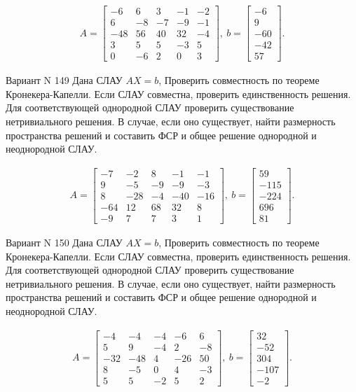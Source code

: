 \documentclass[11pt]{report}
\begin{document}
\begin{align*}
 A = \left[\begin{matrix}-6 & 6 & 3 & -1 & -2\\6 & -8 & -7 & -9 & -1\\-48 & 56 & 40 & 32 & -4\\3 & 5 & 5 & -3 & 5\\0 & -6 & 2 & 0 & 3\end{matrix}\right],
\ b = \left[\begin{matrix}-6\\9\\-60\\-42\\57\end{matrix}\right]. 
 \end{align*}

Вариант N 149
Дана СЛАУ $AX = b$,
Проверить совместность по теореме Кронекера-Капелли. Если СЛАУ совместна, проверить единственность решения.
Для соответствующей однородной СЛАУ проверить существование нетривиального решения. В случае, если оно существует,
найти размерность пространства решений и составить ФСР и общее решение однородной  и неоднородной СЛАУ.


\begin{align*}
 A = \left[\begin{matrix}-7 & -2 & 8 & -1 & -1\\9 & -5 & -9 & -9 & -3\\8 & -28 & -4 & -40 & -16\\-64 & 12 & 68 & 32 & 8\\-9 & 7 & 7 & 3 & 1\end{matrix}\right],
\ b = \left[\begin{matrix}59\\-115\\-224\\696\\81\end{matrix}\right]. 
 \end{align*}

Вариант N 150
Дана СЛАУ $AX = b$,
Проверить совместность по теореме Кронекера-Капелли. Если СЛАУ совместна, проверить единственность решения.
Для соответствующей однородной СЛАУ проверить существование нетривиального решения. В случае, если оно существует,
найти размерность пространства решений и составить ФСР и общее решение однородной  и неоднородной СЛАУ.


\begin{align*}
 A = \left[\begin{matrix}-4 & -4 & -4 & -6 & 6\\5 & 9 & -4 & 2 & -8\\-32 & -48 & 4 & -26 & 50\\8 & -5 & 0 & 4 & -3\\5 & 5 & -2 & 5 & 2\end{matrix}\right],
\ b = \left[\begin{matrix}32\\-52\\304\\-107\\-2\end{matrix}\right]. 
 \end{align*}
\end{document}
